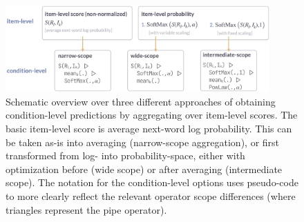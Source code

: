 \documentclass[fleqn]{article}
\begin{document}
\begin{figure}
  \centering
  \includegraphics[width=0.9\textwidth]{00-pics/measures-overview.png}
  \caption{
    Schematic overview over three different approaches of obtaining condition-level predictions by aggregating over item-level scores.
    The basic item-level score is average next-word log probability.
    This can be taken as-is into averaging (narrow-scope aggregation), or first transformed from log- into probability-space, either with optimization before (wide scope) or after averaging (intermediate scope).
    The notation for the condition-level options uses pseudo-code to more clearly reflect the relevant operator scope differences (where triangles represent the pipe operator).
  }
  \label{fig:measures-overview}
\end{figure}
\end{document}
